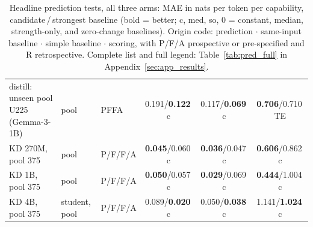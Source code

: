 \begin{table}[!t]
\begin{tabular}{@{}>{\raggedright\arraybackslash}p{4.15cm}>{\raggedright\arraybackslash}p{1.4cm}lccc@{}}
\addlinespace[1.5pt]
distill: unseen pool U225 (Gemma-3-1B) & pool & PFFA & 0.191/\textbf{0.122}{\scriptsize\,c} & 0.117/\textbf{0.069}{\scriptsize\,c} & \textbf{0.706}/0.710{\scriptsize\,TE} \\
\addlinespace[1.5pt]
KD 270M, pool 375 & pool & P/F/F/A & \textbf{0.045}/0.060{\scriptsize\,c} & \textbf{0.036}/0.047{\scriptsize\,c} & \textbf{0.606}/0.862{\scriptsize\,c} \\
KD 1B, pool 375 & pool & P/F/F/A & \textbf{0.050}/0.057{\scriptsize\,c} & \textbf{0.029}/0.069{\scriptsize\,c} & \textbf{0.444}/1.004{\scriptsize\,c} \\
KD 4B, pool 375 & student, pool & P/F/F/A & 0.089/\textbf{0.020}{\scriptsize\,c} & 0.050/\textbf{0.038}{\scriptsize\,c} & 1.141/\textbf{1.024}{\scriptsize\,c} \\
\bottomrule\end{tabular}
\caption{\scriptsize Headline prediction tests, all three arms: MAE in nats per token per capability, candidate\,/\,strongest baseline (bold = better; c, med, so, 0 = constant, median, strength-only, and zero-change baselines). Origin code: prediction $\cdot$ same-input baseline $\cdot$ simple baseline $\cdot$ scoring, with P/F/A prospective or pre-specified and R retrospective. Complete list and full legend: Table~\ref{tab:pred_full} in Appendix~\ref{sec:app_results}.}
\label{tab:main_final}\end{table}

